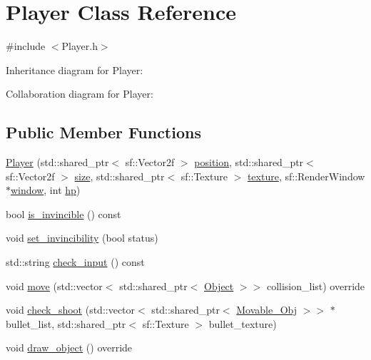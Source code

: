 \hypertarget{classPlayer}{}\section{Player Class Reference}
\label{classPlayer}


{\ttfamily \#include $<$Player.\+h$>$}



Inheritance diagram for Player\+:


Collaboration diagram for Player\+:
\subsection*{Public Member Functions}
\begin{DoxyCompactItemize}
\item 
\hyperlink{classPlayer_a3bd9be84b1533f4ab0a6cb9030ec84da}{Player} (std\+::shared\+\_\+ptr$<$ sf\+::\+Vector2f $>$ \hyperlink{classObject_a8b1724482fb412feb64a638038161b7a}{position}, std\+::shared\+\_\+ptr$<$ sf\+::\+Vector2f $>$ \hyperlink{classObject_ac8bfde5d0428d9c091854fe1a09b7d9f}{size}, std\+::shared\+\_\+ptr$<$ sf\+::\+Texture $>$ \hyperlink{classObject_a8ff6491b841d0f48da3d98041fbca934}{texture}, sf\+::\+Render\+Window $\ast$\hyperlink{classObject_a5c6cfc086ea1e39e0b3cf8633a763bf8}{window}, int \hyperlink{classCharacter_a273353643988a87a0ce03cff3870b2d9}{hp})
\item 
bool \hyperlink{classPlayer_aedcb14b7e42d95d6b1fdb7dd6879dd2b}{is\+\_\+invincible} () const
\item 
void \hyperlink{classPlayer_a8ca5d55325b3037c2123b88f1bd3412d}{set\+\_\+invincibility} (bool status)
\item 
std\+::string \hyperlink{classPlayer_a25be60a0655359b66a05657d6ccaa537}{check\+\_\+input} () const
\item 
void \hyperlink{classPlayer_ace418f6e52cafc354f57268cfe4b646a}{move} (std\+::vector$<$ std\+::shared\+\_\+ptr$<$ \hyperlink{classObject}{Object} $>$$>$ collision\+\_\+list) override
\item 
void \hyperlink{classPlayer_acaadb9db9181983bc036ded7f932a65e}{check\+\_\+shoot} (std\+::vector$<$ std\+::shared\+\_\+ptr$<$ \hyperlink{classMovable__Obj}{Movable\+\_\+\+Obj} $>$$>$ $\ast$bullet\+\_\+list, std\+::shared\+\_\+ptr$<$ sf\+::\+Texture $>$ bullet\+\_\+texture)
\item 
void \hyperlink{classPlayer_a18996f72627e846529e741e4f8efb3dd}{draw\+\_\+object} () override
\end{DoxyCompactItemize}
